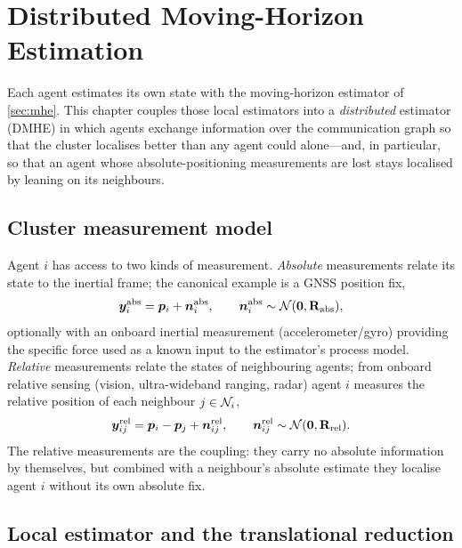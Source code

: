 \chapter{Distributed Moving-Horizon Estimation}
\label{ch:dmhe}

Each agent estimates its own state with the moving-horizon estimator of
\cref{sec:mhe}. This chapter couples those local estimators into a
\emph{distributed} estimator (DMHE) in which agents exchange information over the
communication graph so that the cluster localises better than any agent could
alone---and, in particular, so that an agent whose absolute-positioning
measurements are lost stays localised by leaning on its neighbours.

\section{Cluster measurement model}

Agent $i$ has access to two kinds of measurement. \emph{Absolute} measurements
relate its state to the inertial frame; the canonical example is a GNSS position
fix,
\begin{equation}
\bm{y}_i^{\text{abs}}=\bm{p}_i+\bm{n}_i^{\text{abs}},\qquad
\bm{n}_i^{\text{abs}}\sim\mathcal N(\bm{0},\mathbf{R}_{\text{abs}}),
\label{eq:abs-meas}
\end{equation}
optionally with an onboard inertial measurement (accelerometer/gyro) providing
the specific force used as a known input to the estimator's process model.
\emph{Relative} measurements relate the states of neighbouring agents; from
onboard relative sensing (vision, ultra-wideband ranging, radar) agent $i$
measures the relative position of each neighbour $j\in\mathcal{N}_i$,
\begin{equation}
\bm{y}_{ij}^{\text{rel}}=\bm{p}_i-\bm{p}_j+\bm{n}_{ij}^{\text{rel}},\qquad
\bm{n}_{ij}^{\text{rel}}\sim\mathcal N(\bm{0},\mathbf{R}_{\text{rel}}).
\label{eq:rel-meas}
\end{equation}
The relative measurements are the coupling: they carry no absolute information by
themselves, but combined with a neighbour's absolute estimate they localise
agent $i$ without its own absolute fix.

\section{Local estimator and the translational reduction}


